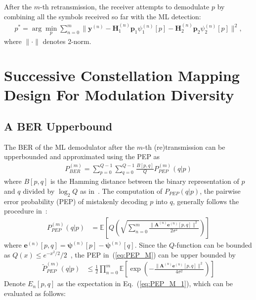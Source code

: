 \documentclass[journal,draftcls,onecolumn,12pt,twoside]{IEEEtran}
\begin{document}
After the $m$-th retransmission, the receiver attempts to
demodulate $p$ by combining all the symbols received so far with the ML
detection:
\begin{align}
    p^* = \arg\min_p\sum_{n = 0}^{m}\|\mathbf{y}^{(n)} -
    \mathbf{H}_1^{(n)}\mathbf{p}_1\psi_1^{(n)}[p] -
    \mathbf{H}_2^{(n)}\mathbf{p}_2\psi_2^{(n)}[p]\|^2,
\end{align}
where $\|\cdot\|$ denotes 2-norm.

\section{Successive Constellation Mapping Design For Modulation Diversity}
\label{sec:modiv}

\subsection{A BER Upperbound}
\label{ssec:ber}
The BER of the ML demodulator after the $m$-th (re)transmission can be
upperbounded and approximated using the PEP as
\begin{align}
  P_{BER}^{(m)} = \sum_{p=0}^{Q - 1}\sum_{q=0}^{Q - 1}\frac{B[p,
  q]}{Q}P_{PEP}^{(m)}(q|p) \label{eq:P_BER}
\end{align}
where $B[p, q]$ is the Hamming distance between the binary
representation of $p$ and $q$ divided by $\log_2Q$ as
in~\cite{samra2005symbol}. The computation of $P_{PEP}(q|p)$, the pairwise
error probability (PEP) of mistakenly decoding $p$ into $q$, generally follows
the procedure in~\cite{han2009performance}:
\begin{align}
    P_{PEP}^{(m)}(q|p) & = \mathbb{E}
    \left[Q\left(\sqrt{\sum_{n=0}^m\frac{\|\mathbf{A}^{(n)}
    \mathbf{e}^{(n)}[p,q]\|^2} {2\sigma^2}}\right)\right]
    \label{eq:PEP_M}
\end{align}
where $\mathbf{e}^{(n)}[p,q] = \bm{\psi}^{(n)}[p] - \bm{\psi}^{(n)}[q]$. Since the
$Q$-function can be bounded as $Q(x)\leq e^{-x^2/2}/2$~\cite{proakisdigital},
the PEP in~(\ref{eq:PEP_M}) can be upper bounded by
\begin{align}
    \tilde{P}_{PEP}^{(m)}(q|p) &\leq
    \frac{1}{2} \prod_{n=0}^{m}
    \mathbb{E}\left[\exp\left(-\frac{\|\mathbf{A}^{(n)}
    \mathbf{e}^{(n)}[p,q]\|^2}{4\sigma^2}\right)\right]
    \label{eq:PEP_M_1}
\end{align}
Denote $E_n[p,q]$ as the expectation in Eq.~(\ref{eq:PEP_M_1}), which can be
evaluated as follows:
\end{document}
